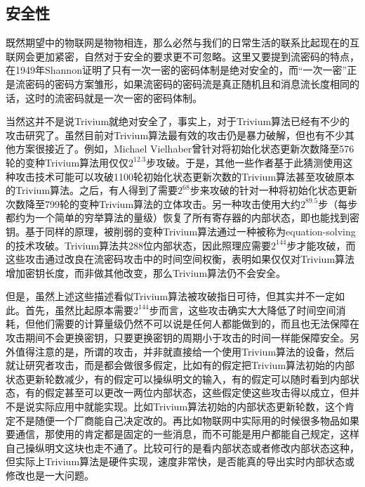 \subsection{安全性}

既然期望中的物联网是物物相连，那么必然与我们的日常生活的联系比起现在的互联网会更加紧密，自然对于安全的要求更不可忽略。这里又要提到流密码的特点，在1949年Shannon证明了只有一次一密的密码体制是绝对安全的，而“一次一密”正是流密码的密码方案雏形，如果流密码的密码流是真正随机且和消息流长度相同的话，这时的流密码就是一次一密的密码体制。

当然这并不是说Trivium就绝对安全了，事实上，对于Trivium算法已经有不少的攻击研究了。虽然目前对Trivium算法最有效的攻击仍是暴力破解，但也有不少其他方案很接近了。例如，Michael Vielhaber曾针对将初始化状态更新次数降至576轮的变种Trivium算法用仅仅$2^{12.3}$步攻破\parencite{cryptoeprint:2007:413}。于是，其他一些作者基于此猜测使用这种攻击技术可能可以攻破1100轮初始化状态更新次数的Trivium算法甚至攻破原本的Trivium算法\parencite{cryptoeprint:2008:385}。之后，有人得到了需要$2^{68}$步来攻破的针对一种将初始化状态更新次数降至799轮的变种Trivium算法的立体攻击\parencite{cryptoeprint:2015:312}。另一种攻击使用大约$2^{89.5}$步（每步都约为一个简单的穷举算法的量级）恢复了所有寄存器的内部状态，即也能找到密钥\parencite{cryptoeprint:2007:021}。基于同样的原理，被削弱的变种Trivium算法通过一种被称为equation-solving的技术攻破\parencite{raddum2006cryptanalytic}。Trivium算法共288位内部状态，因此照理应需要$2^{144}$步才能攻破，而这些攻击通过改良在流密码攻击中的时间空间权衡，表明如果仅仅对Trivium算法增加密钥长度，而非做其他改变，那么Trivium算法仍不会安全。

但是，虽然上述这些描述看似Trivium算法被攻破指日可待，但其实并不一定如此。首先，虽然比起原本需要$2^{144}$步而言，这些攻击确实大大降低了时间空间消耗，但他们需要的计算量级仍然不可以说是任何人都能做到的，而且也无法保障在攻击期间不会更换密钥，只要更换密钥的周期小于攻击的时间一样能保障安全。另外值得注意的是，所谓的攻击，并非就直接给一个使用Trivium算法的设备，然后就让研究者攻击，而是都会做很多假定，比如有的假定把Trivium算法初始的内部状态更新轮数减少，有的假定可以操纵明文的输入，有的假定可以随时看到内部状态，有的假定甚至可以更改一两位内部状态，这些假定使这些攻击得以成立，但并不是说实际应用中就能实现。比如Trivium算法初始的内部状态更新轮数，这个肯定不是随便一个厂商能自己决定改的。再比如物联网中实际用的时候很多物品如果要通信，那使用的肯定都是固定的一些消息，而不可能是用户都能自己规定，这样自己操纵明文这块也走不通了。比较可行的是看内部状态或者修改内部状态这种，但实际上Trivium算法是硬件实现，速度非常快，是否能真的导出实时内部状态或修改也是一大问题。

